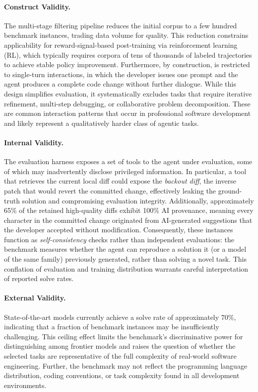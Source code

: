 \paragraph{Construct Validity.}
The multi-stage filtering pipeline reduces the initial corpus to a few hundred benchmark instances, trading data volume for quality. This reduction constrains applicability for reward-signal-based post-training via reinforcement learning (RL), which typically requires corpora of tens of thousands of labeled trajectories to achieve stable policy improvement. Furthermore, by construction, \benchmark{} is restricted to single-turn interactions, in which the developer issues one prompt and the agent produces a complete code change without further dialogue. While this design simplifies evaluation, it systematically excludes tasks that require iterative refinement, multi-step debugging, or collaborative problem decomposition. These are common interaction patterns that occur in professional software development and likely represent a qualitatively harder class of agentic tasks.

\paragraph{Internal Validity.}
The evaluation harness exposes a set of tools to the agent under evaluation, some of which may inadvertently disclose privileged information. In particular, a tool that retrieves the current local diff could expose the \emph{backout diff}, the inverse patch that would revert the committed change, effectively leaking the ground-truth solution and compromising evaluation integrity. Additionally, approximately 65\% of the retained high-quality diffs exhibit 100\% AI provenance, meaning every character in the committed change originated from AI-generated suggestions that the developer accepted without modification. Consequently, these instances function as \emph{self-consistency} checks rather than independent evaluations: the benchmark measures whether the agent can reproduce a solution it (or a model of the same family) previously generated, rather than solving a novel task. This conflation of evaluation and training distribution warrants careful interpretation of reported solve rates.

\paragraph{External Validity.}
State-of-the-art models currently achieve a solve rate of approximately 70\%, indicating that a fraction of benchmark instances may be insufficiently challenging. This ceiling effect limits the benchmark's discriminative power for distinguishing among frontier models and raises the question of whether the selected tasks are representative of the full complexity of real-world software engineering. Further, the benchmark may not reflect the programming language distribution, coding conventions, or task complexity found in all development environments.

